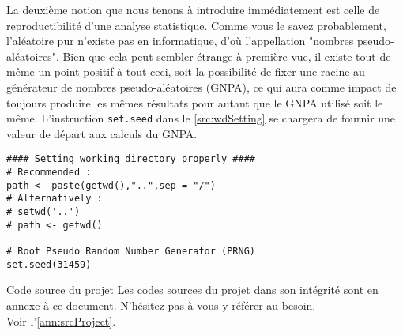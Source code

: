 La deuxième notion que nous tenons à introduire immédiatement est celle de reproductibilité d'une analyse statistique. Comme vous le savez probablement, l'aléatoire pur n'existe pas en informatique, d'où l'appellation "nombres pseudo-aléatoires". Bien que cela peut sembler étrange à première vue, il existe tout de même un point positif à tout ceci, soit la possibilité de fixer une racine au générateur de nombres pseudo-aléatoires (GNPA), ce qui aura comme impact de toujours produire les mêmes résultats pour autant que le GNPA utilisé soit le même. L'instruction \texttt{set.seed} \cite{Rfunction:setseed} dans le \autoref{src:wdSetting} se chargera de fournir une valeur de départ aux calculs du GNPA. \\

\begin{lstlisting}[caption = Environnement de travail,label=src:wdSetting]
#### Setting working directory properly ####
# Recommended :
path <- paste(getwd(),"..",sep = "/")
# Alternatively :
# setwd('..')
# path <- getwd()

# Root Pseudo Random Number Generator (PRNG)
set.seed(31459)
\end{lstlisting} 

\begin{moreInfo}{Code source du projet}
	Les codes sources du projet dans son intégrité sont en annexe à ce document. N'hésitez pas à vous y référer au besoin.\\
	Voir l'\autoref{ann:srcProject}.
\end{moreInfo}